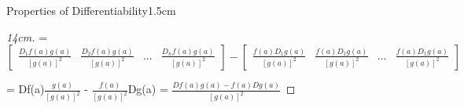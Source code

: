 \begin{ltheorem}{Properties of Differentiability}{1.5cm}
\begin{proof}[14cm]
                \hspace{0.2cm}
                = $
                \begin{bmatrix}
                    \scriptstyle \frac{D_1f(a)g(a)}{[g(a)]^2}
                    & \scriptstyle \frac{D_2f(a)g(a)}{[g(a)]^2}
                    & \scriptstyle ...
                    & \scriptstyle \frac{D_nf(a)g(a)}{[g(a)]^2}
                \end{bmatrix} -
                \begin{bmatrix}
                    \scriptstyle \frac{f(a)D_1g(a)}{[g(a)]^2}
                    & \scriptstyle \frac{f(a)D_1g(a)}{[g(a)]^2}
                    & \scriptstyle ...
                    & \scriptstyle \frac{f(a)D_1g(a)}{[g(a)]^2}
                \end{bmatrix}
                $

                \hspace{0.2cm}
                = Df(a)$\frac{g(a)}{[g(a)]^2}$ - $\frac{f(a)}{[g(a)]^2}$Dg(a)
                = $\frac{Df(a)g(a) - f(a)Dg(a)}{[g(a)]^2}$
            \end{proof}
    \end{ltheorem}

    \vspace{0.5cm}



